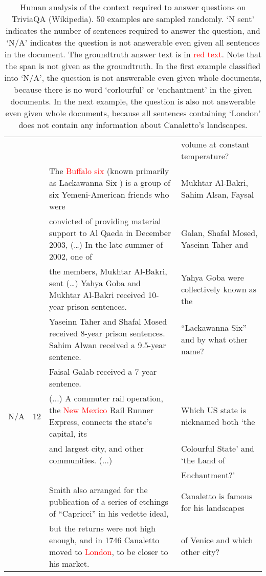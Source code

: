 \documentclass[11pt,a4paper]{article}
\newcommand{\red}[1]{\textcolor{red}{#1}}
\newcommand{\reduce}{\vspace*{-3pt}}
\begin{document}
\begin{table*}[pht]
\begin{center}
{\begin{tabular}{|l|l|l|l|}
 &&&volume at constant temperature?\\
 \cline{3-4}
&& The \red{Buffalo six} (known primarily as Lackawanna Six
) is a group of six Yemeni-American friends who were & Mukhtar Al-Bakri, Sahim Alsan, Faysal \\
&& convicted of providing material support to Al Qaeda in December 2003, (…) In the late summer of 2002, one of &Galan, Shafal Mosed, Yaseinn Taher and  \\
&& the members, Mukhtar Al-Bakri, sent (…)  Yahya Goba and Mukhtar Al-Bakri received 10-year prison sentences. &Yahya Goba were collectively known as the\\
&& Yaseinn Taher and Shafal Mosed received 8-year prison sentences. Sahim Alwan received a 9.5-year sentence. & “Lackawanna Six” and by what other name? \\
&& Faisal Galab received a 7-year sentence. & \\
 \hline
N/A & 12 & (...) A commuter rail operation, the \red{New Mexico} Rail Runner Express, connects the state's capital, its & Which US state is nicknamed both `the\\
&& and largest city, and other communities. (...) & Colourful State' and `the Land of \\
&&&Enchantment?'\\
\cline{3-4}
&& Smith also arranged for the publication of a series of etchings of “Capricci” in his vedette ideal, &
Canaletto is famous for his landscapes \\
&& but the returns were not high enough, and in 1746 Canaletto moved to \red{London}, to be closer to his market. & of Venice and which other city? \\
 \hline
\end{tabular}
}
\end{center}
\reduce
\caption{
Human analysis of the context required to answer questions on TriviaQA (Wikipedia). 50 examples are sampled randomly. `N sent' indicates the number of sentences required to answer the question, and `N/A' indicates the question is not answerable even given all sentences in the document. The groundtruth answer text is in \red{red text}. Note that the span is not given as the groundtruth.
In the first example classified into `N/A', the question is not answerable even given whole documents, because there is no word `corlourful' or `enchantment' in the given documents. In the next example, the question is also not answerable even given whole documents, because all sentences containing `London' does not contain any information about Canaletto's landscapes.
}
\label{tab:triviaqa-motivation}
\end{table*}
\end{document}
